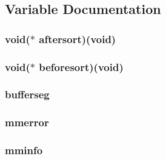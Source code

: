 \subsection{Variable Documentation}
\hypertarget{ID__MM_8H_ae0417d5723e6713c09a179a9c89b1f14}{
\subsubsection[{aftersort}]{\setlength{\rightskip}{0pt plus 5cm}void($\ast$  {\bf aftersort})(void)}}
\label{ID__MM_8H_ae0417d5723e6713c09a179a9c89b1f14}
\hypertarget{ID__MM_8H_a615c8b50b8f67f423250c0ac676a9809}{
\subsubsection[{beforesort}]{\setlength{\rightskip}{0pt plus 5cm}void($\ast$  {\bf beforesort})(void)}}
\label{ID__MM_8H_a615c8b50b8f67f423250c0ac676a9809}
\hypertarget{ID__MM_8H_a08b9369ae972be8f272065cdf755c4f7}{
\subsubsection[{bufferseg}]{ {\bf bufferseg}}}
\label{ID__MM_8H_a08b9369ae972be8f272065cdf755c4f7}
\hypertarget{ID__MM_8H_ae7aac7996350e0ba6ec288d45c450b68}{
\subsubsection[{mmerror}]{ {\bf mmerror}}}
\label{ID__MM_8H_ae7aac7996350e0ba6ec288d45c450b68}
\hypertarget{ID__MM_8H_ac3be51de4543720a019084a1445fe497}{
\subsubsection[{mminfo}]{ {\bf mminfo}}}
\label{ID__MM_8H_ac3be51de4543720a019084a1445fe497}
